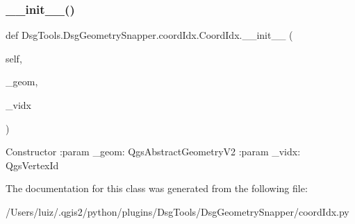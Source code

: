 \subsubsection{\texorpdfstring{\+\_\+\+\_\+init\+\_\+\+\_\+()}{\_\_init\_\_()}}
{\footnotesize\ttfamily def Dsg\+Tools.\+Dsg\+Geometry\+Snapper.\+coord\+Idx.\+Coord\+Idx.\+\_\+\+\_\+init\+\_\+\+\_\+ (\begin{DoxyParamCaption}\item[{}]{self,  }\item[{}]{\+\_\+geom,  }\item[{}]{\+\_\+vidx }\end{DoxyParamCaption})}

\begin{DoxyVerb}Constructor
:param _geom: QgsAbstractGeometryV2
:param _vidx: QgsVertexId
\end{DoxyVerb}
 

The documentation for this class was generated from the following file\+:\begin{DoxyCompactItemize}
\item 
/\+Users/luiz/.\+qgis2/python/plugins/\+Dsg\+Tools/\+Dsg\+Geometry\+Snapper/coord\+Idx.\+py\end{DoxyCompactItemize}
